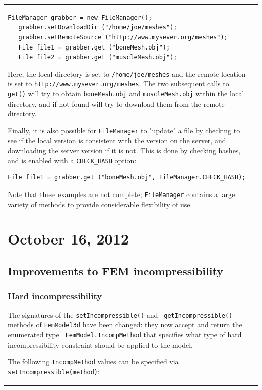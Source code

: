 \documentclass{article}
\begin{document}
\begin{tabular}{ll}
\begin{lstlisting}[]
   FileManager grabber = new FileManager();
   grabber.setDownloadDir ("/home/joe/meshes");
   grabber.setRemoteSource ("http://www.mysever.org/meshes");
   File file1 = grabber.get ("boneMesh.obj");
   File file2 = grabber.get ("muscleMesh.obj");
\end{lstlisting}
Here, the local directory is set to {\tt /home/joe/meshes}
and the remote location is set
to {\tt http://www.mysever.org/meshes}. The two subsequent
calls to {\tt get()} will try to obtain {\tt boneMesh.obj}
and {\tt muscleMesh.obj} within the local directory,
and if not found will try to download them from the
remote directory.

Finally, it is also possible for {\tt FileManager} to "update" a
file by checking to see if the local version is consistent with the
version on the server, and downloading the server version if it is
not. This is done by checking hashes, and is enabled with a 
{\tt CHECK\_HASH} option:
\begin{lstlisting}[]
   File file1 = grabber.get ("boneMesh.obj", FileManager.CHECK_HASH);
\end{lstlisting}

Note that these examples are not complete; {\tt FileManager} contains a large
variety of methods to provide considerable flexibility of use.

\section*{October 16, 2012}

\subsection*{Improvements to FEM incompressibility}

\subsubsection*{Hard incompressibility}

The signatures of the {\tt setIncompressible()} and {\tt
getIncompressible()} methods of {\tt FemModel3d} have been changed:
they now accept and return the enumerated type {\tt
FemModel.IncompMethod} that specifies what type of hard
incompressibility constraint should be applied to the model.

The following {\tt IncompMethod} values can be specified via {\tt
setIncompressible(method)}:


\end{tabular}
\end{document}
